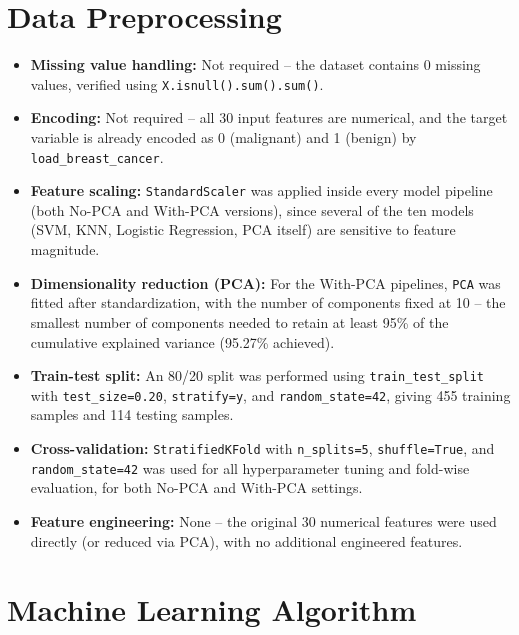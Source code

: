 \documentclass[12pt,a4paper]{article}
\begin{document}
\section{Data Preprocessing}
\begin{itemize}
\item \textbf{Missing value handling:} Not required -- the dataset contains 0 missing values, verified using \texttt{X.isnull().sum().sum()}.

\item \textbf{Encoding:} Not required -- all 30 input features are numerical, and the target variable is already encoded as 0 (malignant) and 1 (benign) by \texttt{load\_breast\_cancer}.

\item \textbf{Feature scaling:} \texttt{StandardScaler} was applied inside every model pipeline (both No-PCA and With-PCA versions), since several of the ten models (SVM, KNN, Logistic Regression, PCA itself) are sensitive to feature magnitude.

\item \textbf{Dimensionality reduction (PCA):} For the With-PCA pipelines, \texttt{PCA} was fitted after standardization, with the number of components fixed at 10 -- the smallest number of components needed to retain at least 95\% of the cumulative explained variance (95.27\% achieved).

\item \textbf{Train-test split:} An 80/20 split was performed using \texttt{train\_test\_split} with \texttt{test\_size=0.20}, \texttt{stratify=y}, and \texttt{random\_state=42}, giving 455 training samples and 114 testing samples.

\item \textbf{Cross-validation:} \texttt{StratifiedKFold} with \texttt{n\_splits=5}, \texttt{shuffle=True}, and \texttt{random\_state=42} was used for all hyperparameter tuning and fold-wise evaluation, for both No-PCA and With-PCA settings.

\item \textbf{Feature engineering:} None -- the original 30 numerical features were used directly (or reduced via PCA), with no additional engineered features.
\end{itemize}

\section{Machine Learning Algorithm}
\end{document}
